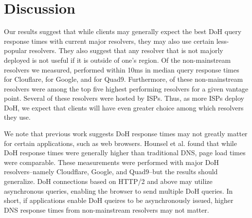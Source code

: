 \section{Discussion}\label{sec:discussion}
Our results suggest that while clients may generally expect the best DoH query response times with current major resolvers, they may also use certain less-popular resolvers.
They also suggest that any resolver that is not majorly deployed is not useful if it is outside of one's region.
Of the  non-mainstream resolvers we measured,  performed within 10ms in median query response times for Clouflare,  for Google, and  for Quad9.
Furthermore,  of these non-mainstream resolvers were among the top five highest performing resolvers for a given vantage point.
Several of these resolvers were hosted by ISPs.
Thus, as more ISPs deploy DoH, we expect that clients will have even greater choice among which resolvers they use.

We note that previous work suggests DoH response times may not greatly matter for certain applications, such as web browsers.
Hounsel et al. found that while DoH response times were generally higher than traditional DNS, page load times were comparable.
These measurements were performed with major DoH resolvers--namely Cloudflare, Google, and Quad9--but the results should generalize.
DoH connections based on HTTP/2 and above may utilize asynchronous queries, enabling the browser to send multiple DoH queries.
In short, if applications enable DoH queires to be asynchronously issued, higher DNS response times from non-mainstream resolvers may not matter.
